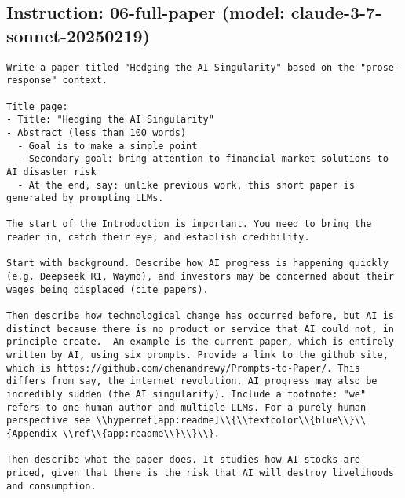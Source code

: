 \subsection*{Instruction: 06-full-paper  (model: claude-3-7-sonnet-20250219)}
\vspace{-1ex}
\begin{lstlisting}[language=text,breaklines=true,frame=single]
Write a paper titled "Hedging the AI Singularity" based on the "prose-response" context.

Title page:
- Title: "Hedging the AI Singularity"  
- Abstract (less than 100 words)
  - Goal is to make a simple point
  - Secondary goal: bring attention to financial market solutions to AI disaster risk
  - At the end, say: unlike previous work, this short paper is generated by prompting LLMs.

The start of the Introduction is important. You need to bring the reader in, catch their eye, and establish credibility.

Start with background. Describe how AI progress is happening quickly (e.g. Deepseek R1, Waymo), and investors may be concerned about their wages being displaced (cite papers). 

Then describe how technological change has occurred before, but AI is distinct because there is no product or service that AI could not, in principle create.  An example is the current paper, which is entirely written by AI, using six prompts. Provide a link to the github site, which is https://github.com/chenandrewy/Prompts-to-Paper/. This differs from say, the internet revolution. AI progress may also be incredibly sudden (the AI singularity). Include a footnote: "we" refers to one human author and multiple LLMs. For a purely human perspective see \\hyperref[app:readme]\\{\\textcolor\\{blue\\}\\{Appendix \\ref\\{app:readme\\}\\}\\}.

Then describe what the paper does. It studies how AI stocks are priced, given that there is the risk that AI will destroy livelihoods and consumption.       


\end{lstlisting}
